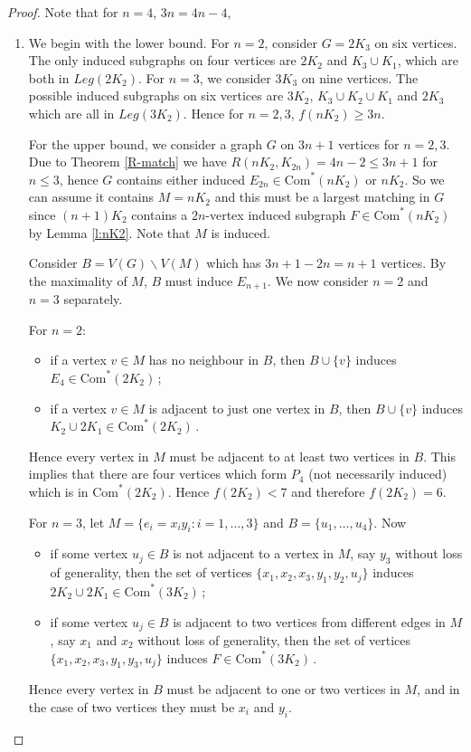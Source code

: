 \documentclass[a4paper,12pt]{article}
\begin{document}
\begin{proof}

Note that for $n=4$, $3n=4n-4$,
\begin{enumerate}
\item{We begin with the lower bound.  For $n=2$, consider $G=2K_3$ on six vertices.  The only induced subgraphs on four vertices are $2K_2$ and $K_3 \cup K_1$, which are both in  $Leg(2K_2)$.  For $n=3$, we consider $3K_3$ on nine vertices.  The possible induced subgraphs on six vertices are $3K_2$, $K_3 \cup K_2 \cup K_1$ and $2K_3$ which are all in $Leg(3K_2)$.  Hence for $n=2,3$, $f(nK_2)\geq 3n$.

For the upper bound, we consider a graph $G$ on $3n+1$ vertices for $n=2,3$. Due to Theorem \ref{R-match} we have $R(nK_2,K_{2n}) =4n-2\leq 3n+1$ for $n \leq 3$, hence $G$ contains either induced $E_{2n} \in \text{Com}^*(nK_2)$ or $nK_2$.   So we can assume it contains $M=nK_2$ and this must be a largest matching in $G$ since $(n+1)K_2$ contains a $2n$-vertex induced subgraph $F \in \text{Com}^*(nK_2)$ by Lemma \ref{l:nK2}. 
Note that $M$ is induced.

Consider $B=V(G) \backslash V(M)$ which has $3n+1-2n=n+1$ vertices. By the maximality of $M$, $B$ must induce $E_{n+1}$. We now consider $n=2$ and $n=3$ separately. 
\smallskip

\noindent For $n=2$:
\begin{itemize}
\item{if a vertex $v \in M$ has no neighbour in $B$, then $B \cup \{v\}$ induces $E_4 \in \text{Com}^*(2K_2)$\,;}
\item{if a vertex $v \in M$ is adjacent to just one vertex in $B$, then $B \cup \{v\}$ induces $K_2 \cup 2K_1 \in \text{Com}^*(2K_2)$\,.}
\end{itemize}
Hence every vertex in $M$ must be adjacent to at least two vertices in $B$.  This implies that there are four vertices which form $P_4$ (not necessarily induced) which is in $\text{Com}^*(2K_2)$.  Hence $f(2K_2)<7$ and therefore $f(2K_2)=6$.

\noindent For $n=3$, let $M= \{ e_i=x_iy_i : i=1 ,\ldots ,3 \}$ and $B=\{u_1, \ldots,u_4\}$. Now 
\begin{itemize}
\item{if some vertex $u_j \in B$ is not adjacent to a vertex in $M$, say $y_3$ without loss of generality, then the set of vertices  $\{x_1,x_2,x_3,y_1,y_2,u_j\}$  induces $2K_2 \cup 2K_1 \in \text{Com}^*(3K_2)$\,;}
\item{if some vertex $u_j \in B$  is adjacent to two vertices from different edges in $M$, say $x_1$ and $x_2$ without loss of generality, then the set of vertices  $\{x_1,x_2,x_3,y_1,y_3,u_j\}$ induces	  $F \in \text{Com}^*(3K_2)$\,.}
\end{itemize}
Hence every vertex in $B$ must be adjacent to one or two vertices in $M$, and in the case of two vertices they must be $x_i$ and $y_i$. 

}
\end{enumerate}
\end{proof}
\end{document}
